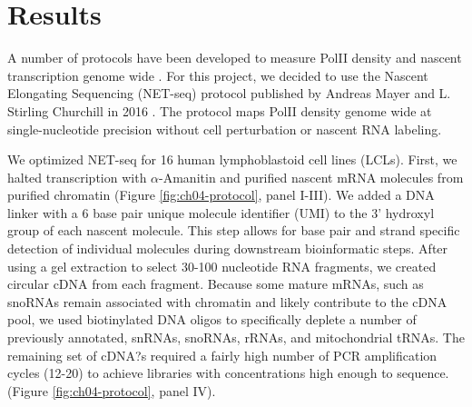 \section{Results}\label{ch04-results}


A number of protocols have been developed to measure PolII density and nascent transcription genome wide \citep{wissink_nascent_2019}. For this project, we decided to use the Nascent Elongating Sequencing (NET-seq) protocol published by Andreas Mayer and L. Stirling Churchill in 2016 \citep{mayer_genome-wide_2016}. The protocol maps PolII density genome wide at single-nucleotide precision without cell perturbation or nascent RNA labeling. 

We optimized NET-seq for 16 human lymphoblastoid cell lines (LCLs). First, we halted transcription with $\alpha$-Amanitin and purified nascent mRNA molecules from purified chromatin (Figure \ref{fig:ch04-protocol}, panel I-III). We added a DNA linker with a 6 base pair unique molecule identifier (UMI) to the 3' hydroxyl group of each nascent molecule. This step allows for base pair and strand specific detection of individual molecules during downstream bioinformatic steps. After using a gel extraction to select 30-100 nucleotide RNA fragments, we created circular cDNA from each fragment. Because some mature mRNAs, such as snoRNAs remain associated with chromatin and likely contribute to the cDNA pool, we used biotinylated DNA oligos to specifically deplete a number of previously annotated, snRNAs, snoRNAs, rRNAs, and mitochondrial tRNAs. The remaining set of cDNA?s required a fairly high number of PCR amplification cycles (12-20) to achieve libraries with concentrations high enough to sequence. (Figure \ref{fig:ch04-protocol}, panel IV).

